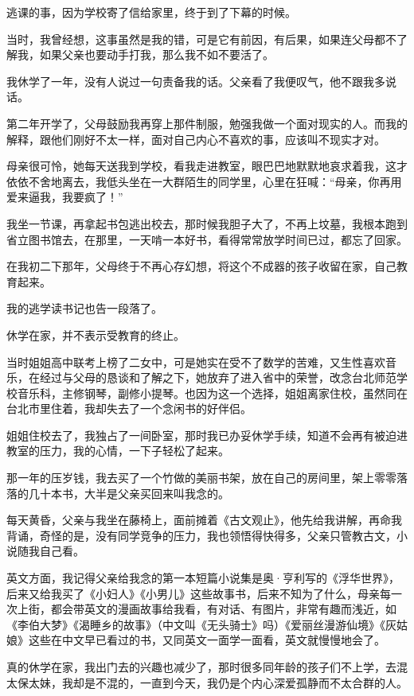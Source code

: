 \par 逃课的事，因为学校寄了信给家里，终于到了下幕的时候。
\par 当时，我曾经想，这事虽然是我的错，可是它有前因，有后果，如果连父母都不了解我，如果父亲也要动手打我，那么我不如不要活了。
\par 我休学了一年，没有人说过一句责备我的话。父亲看了我便叹气，他不跟我多说话。
\par 第二年开学了，父母鼓励我再穿上那件制服，勉强我做一个面对现实的人。而我的解释，跟他们刚好不太一样，面对自己内心不喜欢的事，应该叫不现实才对。
\par 母亲很可怜，她每天送我到学校，看我走进教室，眼巴巴地默默地哀求着我，这才依依不舍地离去，我低头坐在一大群陌生的同学里，心里在狂喊：“母亲，你再用爱来逼我，我要疯了！”
\par 我坐一节课，再拿起书包逃出校去，那时候我胆子大了，不再上坟墓，我根本跑到省立图书馆去，在那里，一天啃一本好书，看得常常放学时间已过，都忘了回家。
\par 在我初二下那年，父母终于不再心存幻想，将这个不成器的孩子收留在家，自己教育起来。
\par 我的逃学读书记也告一段落了。
\par 休学在家，并不表示受教育的终止。
\par 当时姐姐高中联考上榜了二女中，可是她实在受不了数学的苦难，又生性喜欢音乐，在经过与父母的恳谈和了解之下，她放弃了进入省中的荣誉，改念台北师范学校音乐科，主修钢琴，副修小提琴。也因为这一个选择，姐姐离家住校，虽然同在台北市里住着，我却失去了一个念闲书的好伴侣。
\par 姐姐住校去了，我独占了一间卧室，那时我已办妥休学手续，知道不会再有被迫进教室的压力，我的心情，一下子轻松了起来。
\par 那一年的压岁钱，我去买了一个竹做的美丽书架，放在自己的房间里，架上零零落落的几十本书，大半是父亲买回来叫我念的。
\par 每天黄昏，父亲与我坐在藤椅上，面前摊着《古文观止》，他先给我讲解，再命我背诵，奇怪的是，没有同学竞争的压力，我也领悟得快得多，父亲只管教古文，小说随我自己看。
\par 英文方面，我记得父亲给我念的第一本短篇小说集是奥·亨利写的《浮华世界》，后来又给我买了《小妇人》《小男儿》这些故事书，后来不知为了什么，母亲每一次上街，都会带英文的漫画故事给我看，有对话、有图片，非常有趣而浅近，如《李伯大梦》《渴睡乡的故事》（中文叫《无头骑士》吗）《爱丽丝漫游仙境》《灰姑娘》这些在中文早已看过的书，又同英文一面学一面看，英文就慢慢地会了。
\par 真的休学在家，我出门去的兴趣也减少了，那时很多同年龄的孩子们不上学，去混太保太妹，我却是不混的，一直到今天，我仍是个内心深爱孤静而不太合群的人。
